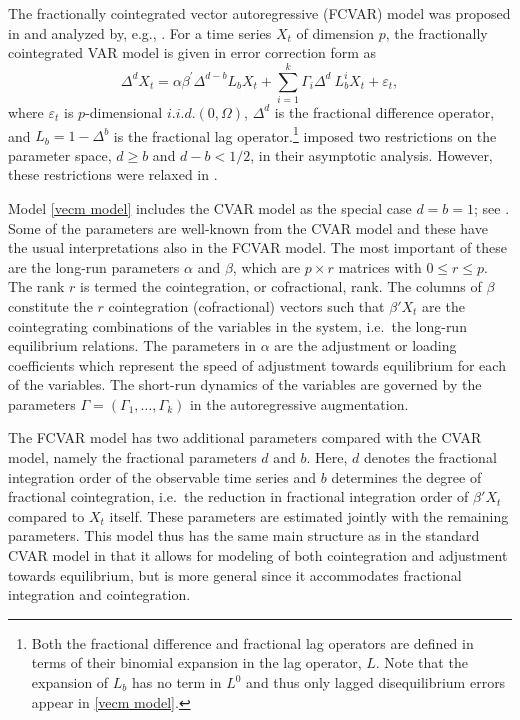 \documentclass[article]{jss}
\begin{document}
The fractionally cointegrated vector autoregressive (FCVAR) model was proposed in \cite{Johansen2008} and analyzed by, e.g., \cite{johniel2010,johansen2012likelihood}. For a time series $X_{t}$ of dimension $p$, the fractionally cointegrated VAR model is given in error correction form as
\begin{equation}
\Delta^{d}X_{t}= \alpha \beta^{\prime} \Delta^{d-b} L_{b} X_{t} + 
\sum_{i=1}^{k}\Gamma_{i}\Delta^{d}\ L_{b}^{i}X_{t}
+ \varepsilon_{t},
\label{vecm model}%
\end{equation}
where $\varepsilon_{t}$ is $p$-dimensional $i.i.d.(0,\Omega)$, $\Delta^{d}$ is the fractional difference operator, and $L_{b}=1-\Delta^{b}$ is the fractional lag operator.\footnote{Both the fractional difference and fractional lag operators are defined in terms of their binomial expansion in the lag operator, $L$. Note that the expansion of $L_{b}$ has no term in $L^{0}$ and thus only lagged disequilibrium errors appear in \eqref{vecm model}.} \cite{johansen2012likelihood} imposed two restrictions on the parameter space, $d\geq b$ and $d-b<1/2$, in their asymptotic analysis. However, these restrictions were relaxed in \cite{JN2018b,JN2018}.

Model \eqref{vecm model} includes the \cite{Johansen1995} CVAR model as the special case $d=b=1$; see \cite{JN2018}. Some of the parameters are well-known from the CVAR model and these have the usual interpretations also in the FCVAR model. The most important of these are the long-run parameters $\alpha$ and $\beta$, which are $p \times r$ matrices with $0 \leq r \leq p$. The rank $r$ is termed the cointegration, or cofractional, rank. The columns of $\beta$ constitute the $r$ cointegration (cofractional) vectors such that $\beta' X_t$ are the cointegrating combinations of the variables in the system, i.e.\ the long-run equilibrium relations. The parameters in $\alpha$ are the adjustment or loading coefficients which represent the speed of adjustment towards equilibrium for each of the variables. The short-run dynamics of the variables are governed by the parameters $\Gamma=(\Gamma _{1},\ldots ,\Gamma _{k})$ in the autoregressive augmentation.

The FCVAR model has two additional parameters compared with the CVAR model, namely the fractional parameters $d$ and $b$. Here, $d$ denotes the fractional integration order of the observable time series and $b$ determines the degree of fractional cointegration, i.e.\ the reduction in fractional integration order of $\beta'X_t$ compared to $X_t$ itself. These parameters are estimated jointly with the remaining parameters. This model thus has the same main structure as in the standard CVAR model in that it allows for modeling of both cointegration and adjustment towards equilibrium, but is more general since it accommodates fractional integration and cointegration.
\end{document}
